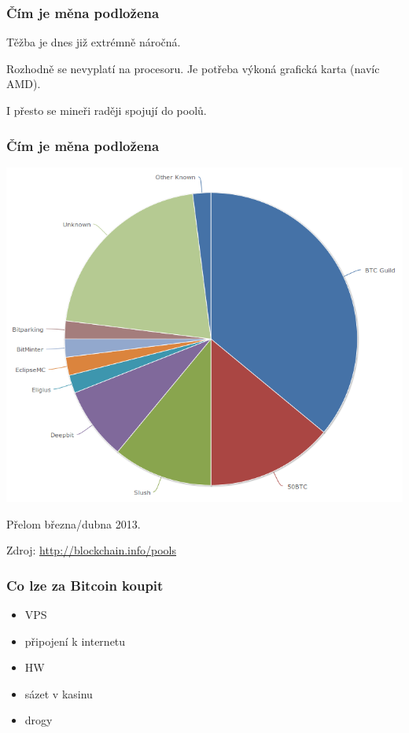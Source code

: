 \documentclass[xetex]{beamer}
\begin{document}
\begin{frame}
	\frametitle{Čím je měna podložena}
	Těžba je dnes již extrémně náročná. 

	\bigskip

	Rozhodně se nevyplatí na procesoru. Je potřeba výkoná grafická karta (navíc AMD).

	\bigskip 

	I přesto se mineři raději spojují do poolů.
\end{frame}

\begin{frame}
	\frametitle{Čím je měna podložena}
	
	\includegraphics[scale=0.25]{images/bitcoin-pools.png}

	Přelom března/dubna 2013.

	Zdroj: \url{http://blockchain.info/pools}
\end{frame}

\begin{frame}
	\frametitle{Co lze za Bitcoin koupit}
	\begin{itemize}
		\item VPS
		\item připojení k internetu
		\item HW
		\item sázet v kasinu
		\item drogy
	\end{itemize}
\end{frame}
\end{document}
